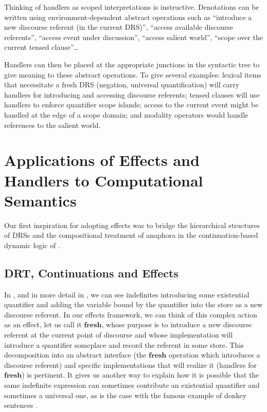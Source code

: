 \documentclass{article}
\newcommand{\effect}[1]{\textbf{#1}}
\begin{document}
Thinking of handlers as scoped interpretations is instructive. Denotations can
be written using environment-dependent abstract operations such as ``introduce
a new discourse referent (in the current DRS)'', ``access available discourse
referents'', ``access event under discussion'', ``access salient world'',
``scope over the current tensed clause''\ldots

Handlers can then be placed at the appropriate junctions in the syntactic tree
to give meaning to these abstract operations. To give several examples:
lexical items that necessitate a fresh DRS (negation, universal
quantification) will carry handlers for introducing and accessing discourse
referents; tensed clauses will use handlers to enforce quantifier scope
islands; access to the current event might be handled at the edge of a scope
domain; and modality operators would handle references to the salient world.

\section{Applications of Effects and Handlers to Computational Semantics}

Our first inspiration for adopting effects was to bridge the hierarchical
structures of DRSs and the compositional treatment of anaphora in the
continuation-based dynamic logic of \citet{de2006towards}.

\subsection{DRT, Continuations and Effects}

In \citet{de2006towards}, and in more detail in
\citet{lebedeva2012expression}, we can see indefinites introducing some
existential quantifier and adding the variable bound by the quantifier into
the store as a new discourse referent. In our effects framework, we can think
of this complex action as an effect, let us call it $\effect{fresh}$, whose
purpose is to introduce a new discourse referent at the current point of
discourse and whose implementation will introduce a quantifier someplace and
record the referent in some store. This decomposition into an abstract
interface (the $\effect{fresh}$ operation which introduces a discourse
referent) and specific implementations that will realize it (handlers for
$\effect{fresh}$) is pertinent. It gives us another way to explain how it is
possible that the same indefinite expression can sometimes contribute an
existential quantifier and sometimes a universal one, as is the case with the
famous example of donkey sentences \citep{kamp1993discourse}.
\end{document}

